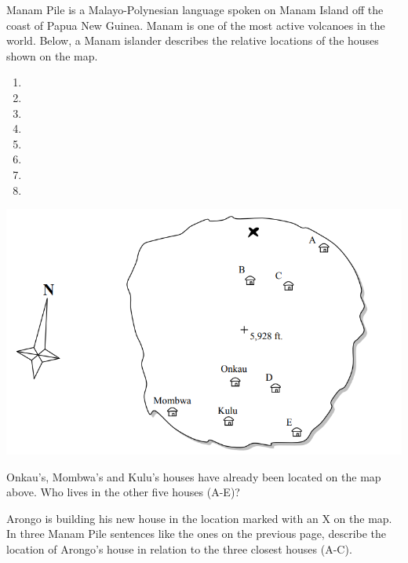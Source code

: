 \begin{refsection}
\begin{problem}{\langnameManam}{\namePLittell}{}
Manam Pile is a Malayo-Polynesian language spoken on Manam Island off the coast of Papua New Guinea. Manam is one of the most active volcanoes in the world. Below, a Manam islander describes the relative locations of the houses shown on the map.

\begin{enumerate}
    \item {}
    \item {}
    \item {}
    \item {}
    \item {}
    \item {}
    \item {}
    \item {}
\end{enumerate}

\noindent\includegraphics[width = \linewidth]{images/Manam.png}

\begin{assgts}
\item Onkau's, Mombwa's and Kulu's houses have already been located on the map above. Who lives in the other five houses (A-E)?
\item Arongo is building his new house in the location marked with an X on the map. In three Manam Pile sentences like the ones on the previous page, describe the location of Arongo's house in relation to the three closest houses (A-C).
\end{assgts}
\end{problem}


\end{refsection}
